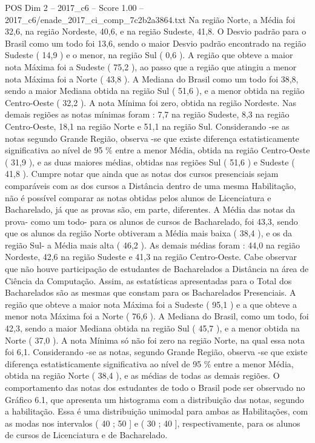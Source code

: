 \begin{textsample}{POS Dim 2 – 2017\_c6 – Score 1.00 – 2017\_c6/enade\_2017\_ci\_comp\_7c2b2a3864.txt}
Na região Norte, a Média foi 32,6, na região Nordeste, 40,6, e na região Sudeste, 41,8.
O Desvio padrão para o Brasil como um todo foi 13,6, sendo o maior Desvio padrão encontrado na região Sudeste ( 14,9 ) e o menor, na região Sul ( 0,6 ).
A região que obteve a maior nota Máxima foi a Sudeste ( 75,2 ), ao passo que a região que atingiu a menor nota Máxima foi a Norte ( 43,8 ).
A Mediana do Brasil como um todo foi 38,8, sendo a maior Mediana obtida na região Sul ( 51,6 ), e a menor obtida na região Centro-Oeste ( 32,2 ).
A nota Mínima foi zero, obtida na região Nordeste.
Nas demais regiões as notas mínimas foram : 7,7 na região Sudeste, 8,3 na região Centro-Oeste, 18,1 na região Norte e 51,1 na região Sul.
Considerando -se as notas segundo Grande Região, observa -se que existe diferença estatisticamente significativa ao nível de 95 \% entre a menor Média, obtida na região Centro-Oeste ( 31,9 ), e as duas maiores médias, obtidas nas regiões Sul ( 51,6 ) e Sudeste ( 41,8 ).
Cumpre notar que ainda que as notas dos cursos presenciais sejam comparáveis com as dos cursos a Distância dentro de uma mesma Habilitação, não é possível comparar as notas obtidas pelos alunos de Licenciatura e Bacharelado, já que as provas são, em parte, diferentes.
A Média das notas da prova- como um todo- para os alunos de cursos de Bacharelado, foi 43,3, sendo que os alunos da região Norte obtiveram a Média mais baixa ( 38,4 ), e os da região Sul- a Média mais alta ( 46,2 ).
As demais médias foram : 44,0 na região Nordeste, 42,6 na região Sudeste e 41,3 na região Centro-Oeste.
Cabe observar que não houve participação de estudantes de Bacharelados a Distância na área de Ciência da Computação.
Assim, as estatísticas apresentadas para o Total dos Bacharelados são as mesmas que constam para os Bacharelados Presenciais.
A região que obteve a maior nota Máxima foi a Sudeste ( 95,1 ) e a que obteve a menor nota Máxima foi a Norte ( 76,6 ).
A Mediana do Brasil, como um todo, foi 42,3, sendo a maior Mediana obtida na região Sul ( 45,7 ), e a menor obtida na Norte ( 37,0 ).
A nota Mínima só não foi zero na região Norte, na qual essa nota foi 6,1.
Considerando -se as notas, segundo Grande Região, observa -se que existe diferença estatisticamente significativa ao nível de 95 \% entre a menor Média, obtida na região Norte ( 38,4 ), e as médias de todas as demais regiões.
O comportamento das notas dos estudantes de todo o Brasil pode ser observado no Gráfico 6.1, que apresenta um histograma com a distribuição das notas, segundo a habilitação.
Essa é uma distribuição unimodal para ambas as Habilitações, com as modas nos intervalos ( 40 ; 50 ] e ( 30 ; 40 ], respectivamente, para os alunos de cursos de Licenciatura e de Bacharelado.

\end{textsample}

